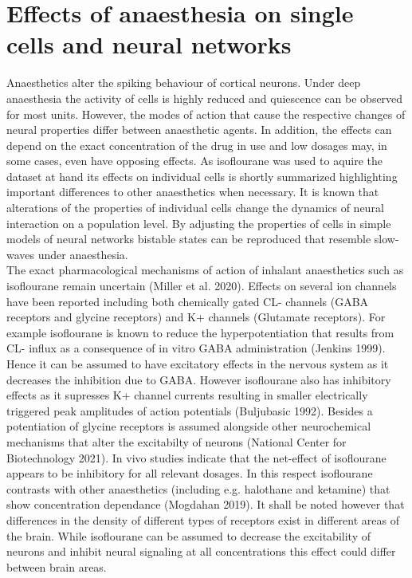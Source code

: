 
\section{Effects of anaesthesia on single cells and neural networks}
\label{effects_of_anaesthesia}
Anaesthetics alter the spiking behaviour of cortical neurons. Under deep anaesthesia the activity of cells is highly reduced and quiescence can be observed for most units. However, the modes of action that cause the respective changes of neural properties differ between anaesthetic agents. In addition, the effects can depend on the exact concentration of the drug in use and low dosages may, in some cases, even have opposing effects. As isoflourane was used to aquire the dataset at hand its effects on individual cells is shortly summarized highlighting important differences to other anaesthetics when necessary. It is known that alterations of the properties of individual cells change the dynamics of neural interaction on a population level. By adjusting the properties of cells in simple models of neural networks bistable states can be reproduced that resemble slow-waves under anaesthesia.\\
The exact pharmacological mechanisms of action of inhalant anaesthetics such as isoflourane remain uncertain (Miller et al. 2020). Effects on several ion channels have been reported including both chemically gated CL- channels (GABA receptors and glycine receptors) and K+ channels (Glutamate receptors). For example isoflourane is known to reduce the hyperpotentiation that results from CL- influx as a consequence of in vitro GABA administration (Jenkins 1999). Hence it can be assumed to have excitatory effects in the nervous system as it decreases the inhibition due to GABA. However isoflourane also has inhibitory effects as it supresses K+ channel currents resulting in smaller electrically triggered peak amplitudes of action potentials (Buljubasic 1992). Besides a potentiation of glycine receptors is assumed alongside other neurochemical mechanisms that alter the excitabilty of neurons (National Center for Biotechnology 2021). In vivo studies indicate that the net-effect of isoflourane appears to be inhibitory for all relevant dosages. In this respect isoflourane contrasts with other anaesthetics (including e.g. halothane and ketamine) that show concentration dependance (Mogdahan 2019). It shall be noted however that differences in the density of different types of receptors exist in different areas of the brain. While isoflourane can be assumed to decrease the excitability of neurons and inhibit neural signaling at all concentrations this effect could differ between brain areas.\\

